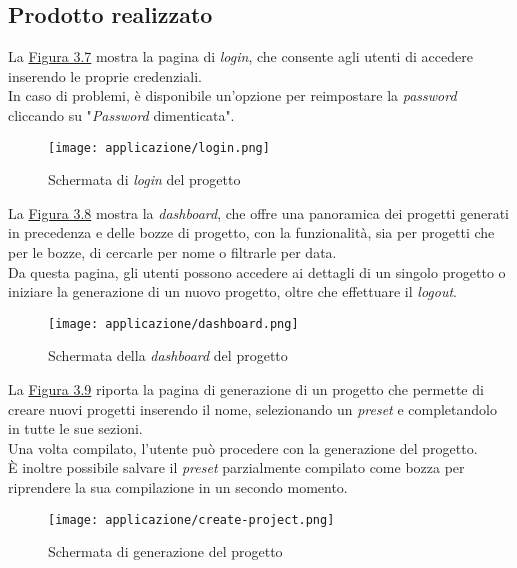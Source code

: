 \subsection{Prodotto realizzato}
\label{subsec:prodotto-realizzato}

La {\hyperref[fig:login]{Figura 3.7}} mostra la pagina di \textit{login}, che consente agli utenti di accedere inserendo le proprie credenziali.\\
In caso di problemi, è disponibile un'opzione per reimpostare la \textit{password} cliccando su "\textit{Password} dimenticata".
\begin{figure}[H]
    \centering
    \texttt{[image: applicazione/login.png]}
    \caption{Schermata di \textit{login} del progetto}
    \label{fig:login}
\end{figure}

\pagebreak
\noindent La {\hyperref[fig:dashboard]{Figura 3.8}} mostra la \textit{dashboard}, che offre una panoramica dei progetti generati in precedenza e delle bozze di progetto, con la funzionalità, sia per progetti che per le bozze,
di cercarle per nome o filtrarle per data. \\
Da questa pagina, gli utenti possono accedere ai dettagli di un singolo progetto o iniziare la generazione di un nuovo progetto, oltre che effettuare il \textit{logout}.\\
\begin{figure}[H]
    \centering
    \texttt{[image: applicazione/dashboard.png]}
    \caption{Schermata della \textit{dashboard} del progetto}
    \label{fig:dashboard}
\end{figure}

\pagebreak
\noindent La {\hyperref[fig:create-project]{Figura 3.9}} riporta la pagina di generazione di un progetto che permette di creare nuovi progetti inserendo il nome, selezionando un \textit{preset} e completandolo in tutte le sue sezioni.\\
Una volta compilato, l’utente può procedere con la generazione del progetto. \\
È inoltre possibile salvare il \textit{preset} parzialmente compilato come bozza per riprendere la sua compilazione in un secondo momento.
\begin{figure}[H]
    \centering
    \texttt{[image: applicazione/create-project.png]}
    \caption{Schermata di generazione del progetto}
    \label{fig:create-project}
\end{figure}

